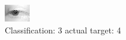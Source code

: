 \begin{figure}[h!]
\begin{center}
\includegraphics[width=0.60\columnwidth]{figures/ID2695_class_3_target_4.png}
\end{center}
\caption{ Classification: 3 actual target: 4}
\label{fig:ID2695_class_3_target_4}
\end{figure}
